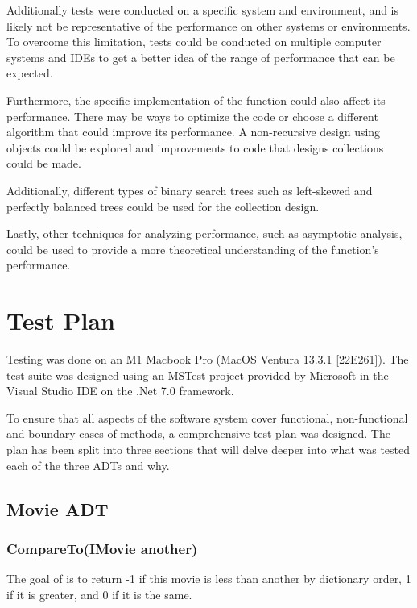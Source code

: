 \documentclass[a4paper]{article}
\begin{document}
\noindent
Additionally tests were conducted on a specific system and environment, and is likely not be representative of the performance on other systems or environments. To overcome this limitation, tests could be conducted on multiple computer systems and IDEs to get a better idea of the range of performance that can be expected.
\vspace{3mm}

\noindent
Furthermore, the specific implementation of the function could also affect its performance. There may be ways to optimize the code or choose a different algorithm that could improve its performance. A non-recursive design using  objects could be explored and improvements to code that designs collections could be made.
\vspace{3mm}

\noindent
Additionally, different types of binary search trees such as left-skewed and perfectly balanced trees could be used for the collection design.
\vspace{3mm}

\noindent
Lastly, other techniques for analyzing performance, such as asymptotic analysis, could be used to provide a more theoretical understanding of the function's performance.
\pagebreak

\section{Test Plan}
Testing was done on an M1 Macbook Pro (MacOS Ventura 13.3.1 [22E261]). The test suite was designed using an MSTest project provided by Microsoft in the Visual Studio IDE on the {.}Net 7.0 framework.
\vspace{1.5mm}

\noindent
To ensure that all aspects of the software system cover functional, non-functional and boundary cases of methods, a comprehensive test plan was designed. The plan has been split into three sections that will delve deeper into what was tested each of the three ADTs and why.
\vspace{3mm}

\subsection{Movie ADT}

\subsubsection{CompareTo{(IMovie another)}}
The goal of  is to return -1 if this movie is less than another by dictionary order, 1 if it is greater, and 0 if it is the same.
\vspace{3mm}
\end{document}
